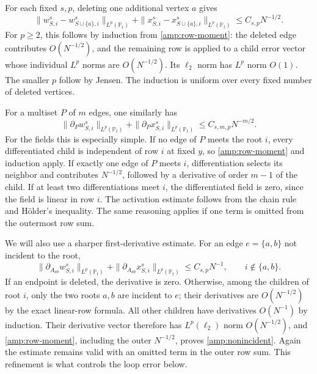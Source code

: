 \documentclass[11pt,reqno]{amsart}
\begin{document}
For each fixed $s,p$, deleting one additional vertex $a$ gives
\begin{equation}\label{amp:delete}
 \|w^s_{S,i}-w^s_{S\cup\{a\},i}\|_{L^p(\mathbb P_t)}
 +\|x^s_{S,i}-x^s_{S\cup\{a\},i}\|_{L^p(\mathbb P_t)}
 \le C_{s,p}N^{-1/2}.
\end{equation}
For $p\ge2$, this follows by induction from
\eqref{amp:row-moment}: the deleted edge contributes $O(N^{-1/2})$,
and the remaining row is applied to a child error vector whose individual
$L^p$ norms are $O(N^{-1/2})$.  Its $\ell_2$ norm has $L^p$ norm $O(1)$.
The smaller $p$ follow by Jensen.  The induction is uniform over every
fixed number of deleted vertices.

For a multiset $P$ of $m$ edges, one similarly has
\begin{equation}\label{amp:derivative}
 \|\partial_P w^s_{S,i}\|_{L^p(\mathbb P_t)}
 +\|\partial_P x^s_{S,i}\|_{L^p(\mathbb P_t)}
 \le C_{s,m,p}N^{-m/2}.
\end{equation}
For the fields this is especially simple.  If no edge of $P$ meets the
root $i$, every differentiated child is independent of row $i$ at fixed
$y$, so \eqref{amp:row-moment} and induction apply.  If exactly one
edge of $P$ meets $i$, differentiation selects its neighbor and contributes
$N^{-1/2}$, followed by a derivative of order $m-1$ of the child.
If at least two differentiations meet $i$, the differentiated field is
zero, since the field is linear in row $i$.  The activation estimate
follows from the chain rule and H\"older's inequality.  The same reasoning
applies if one term is omitted from the outermost row sum.

We will also use a sharper first-derivative estimate.  For an edge
$e=\{a,b\}$ not incident to the root,
\begin{equation}\label{amp:nonincident}
 \|\partial_{A_{ab}} w^s_{S,i}\|_{L^p(\mathbb P_t)}
 +\|\partial_{A_{ab}} x^s_{S,i}\|_{L^p(\mathbb P_t)}
 \le C_{s,p}N^{-1},\qquad i\notin\{a,b\}.
\end{equation}
If an endpoint is deleted, the derivative is zero.  Otherwise, among the
children of root $i$, only the two roots $a,b$ are incident to $e$; their
derivatives are $O(N^{-1/2})$ by the exact linear-row formula.  All other
children have derivatives $O(N^{-1})$ by induction.  Their derivative
vector therefore has $L^p(\ell_2)$ norm $O(N^{-1/2})$, and
\eqref{amp:row-moment}, including the outer $N^{-1/2}$, proves
\eqref{amp:nonincident}.  Again the estimate remains valid with an
omitted term in the outer row sum.  This refinement is what controls the
loop error below.
\end{document}
